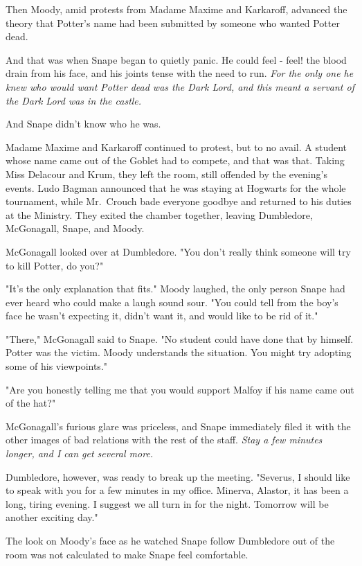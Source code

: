 Then Moody, amid protests from Madame Maxime and Karkaroff, advanced the theory that Potter's name had been submitted by someone who wanted Potter dead.

And that was when Snape began to quietly panic. He could feel - feel! the blood drain from his face, and his joints tense with the need to run. \emph{For the only one he knew who would want Potter dead was the Dark Lord, and this meant a servant of the Dark Lord was in the castle.}

And Snape didn't know who he was.

Madame Maxime and Karkaroff continued to protest, but to no avail. A student whose name came out of the Goblet had to compete, and that was that. Taking Miss Delacour and Krum, they left the room, still offended by the evening's events. Ludo Bagman announced that he was staying at Hogwarts for the whole tournament, while Mr.~Crouch bade everyone goodbye and returned to his duties at the Ministry. They exited the chamber together, leaving Dumbledore, McGonagall, Snape, and Moody.

McGonagall looked over at Dumbledore. "You don't really think someone will try to kill Potter, do you?"

"It's the only explanation that fits." Moody laughed, the only person Snape had ever heard who could make a laugh sound sour. "You could tell from the boy's face he wasn't expecting it, didn't want it, and would like to be rid of it."

"There," McGonagall said to Snape. "No student could have done that by himself. Potter was the victim. Moody understands the situation. You might try adopting some of his viewpoints."

"Are you honestly telling me that you would support Malfoy if his name came out of the hat?"

McGonagall's furious glare was priceless, and Snape immediately filed it with the other images of bad relations with the rest of the staff. \emph{Stay a few minutes longer, and I can get several more.}

Dumbledore, however, was ready to break up the meeting. "Severus, I should like to speak with you for a few minutes in my office. Minerva, Alastor, it has been a long, tiring evening. I suggest we all turn in for the night. Tomorrow will be another exciting day."

The look on Moody's face as he watched Snape follow Dumbledore out of the room was not calculated to make Snape feel comfortable.

